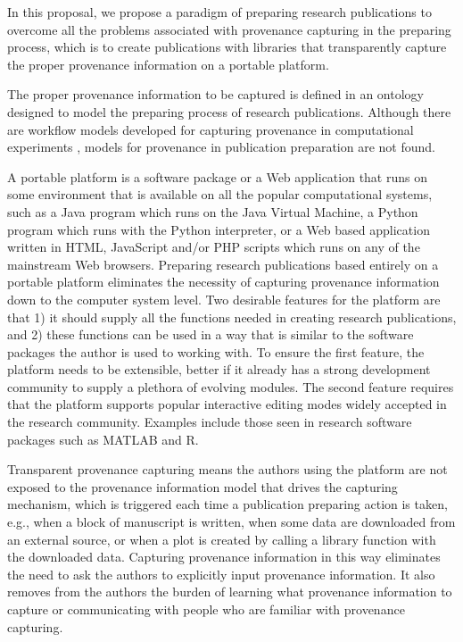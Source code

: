 In this proposal, we propose a paradigm of preparing research publications to overcome all the problems associated with provenance capturing in the preparing process, which is to create publications with libraries that transparently capture the proper provenance information on a portable platform.

The proper provenance information to be captured is defined in an ontology designed to model the preparing process of research publications. Although there are workflow models developed for capturing provenance in computational experiments \cite{groth2006architecture, groth2009recording}, models for provenance in publication preparation are not found. 

A portable platform is a software package or a Web application that runs on some environment that is available on all the popular computational systems, such as a Java program which runs on the Java Virtual Machine, a Python program which runs with the Python interpreter, or a Web based application written in HTML, JavaScript and/or PHP scripts which runs on any of the mainstream Web browsers. Preparing research publications based entirely on a portable platform eliminates the necessity of capturing provenance information down to the computer system level. Two desirable features for the platform are that 1) it should supply all the functions needed in creating research publications, and 2) these functions can be used in a way that is similar to the software packages the author is used to working with. To ensure the first feature, the platform needs to be extensible, better if it already has a strong development community to supply a plethora of evolving modules. The second feature requires that the platform supports popular interactive editing modes widely accepted in the research community. Examples include those seen in research software packages such as MATLAB and R.

Transparent provenance capturing means the authors using the platform are not exposed to the provenance information model that drives the capturing mechanism, which is triggered each time a publication preparing action is taken, e.g., when a block of manuscript is written, when some data are downloaded from an external source, or when a plot is created by calling a library function with the downloaded data. Capturing provenance information in this way eliminates the need to ask the authors to explicitly input provenance information. It also removes from the authors the burden of learning what provenance information to capture or communicating with people who are familiar with provenance capturing.

